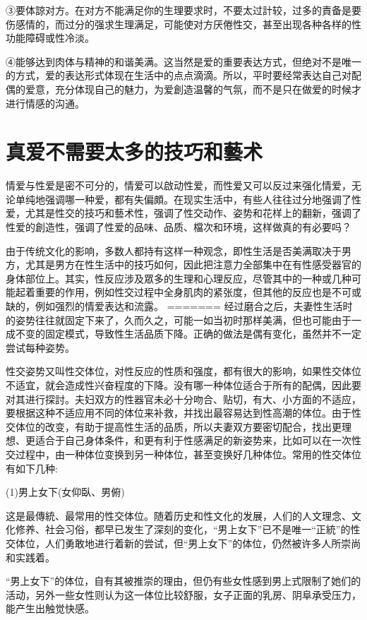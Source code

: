 \documentclass[12pt,UTF8]{ctexbook}
\begin{document}
③要体諒对方。在对方不能满足你的生理要求时，不要太过計较，过多的責备是要伤感情的，而过分的强求生理满足，可能使对方厌倦性交，甚至出现各种各样的性功能障碍或性冷淡。

④能够达到肉体与精神的和谐美满。这当然是爱的重要表达方式，但绝对不是唯一的方式，爱的表达形式体现在生活中的点点滴滴。所以，平时要经常表达自己对配偶的爱意，充分体现自己的魅力，为爱創造温馨的气氛，而不是只在做爱的时候才进行情感的沟通。

\section{真爱不需要太多的技巧和藝术}

情爱与性爱是密不可分的，情爱可以啟动性爱，而性爱又可以反过来强化情爱，无论单纯地强调哪一种爱，都有失偏頗。在现实生活中，有些人往往过分地强调了性爱，尤其是性交的技巧和藝术性，强调了性交动作、姿势和花样上的翻新，强调了性爱的創造性，强调了性爱的品味、品质、檔次和环境，这样做真的有必要吗？

由于传统文化的影响，多数人都持有这样一种观念，即性生活是否美满取决于男方，尤其是男方在性生活中的技巧如何，因此把注意力全部集中在有性感受器官的身体部位上。其实，性反应涉及眾多的生理和心理反应，尽管其中的一种或几种可能起着重要的作用，例如性交过程中全身肌肉的紧张度，但其他的反应也是不可或缺的，例如强烈的情爱表达和流露。
=======
经过磨合之后，夫妻性生活时的姿势往往就固定下来了，久而久之，可能一如当初时那样美满，但也可能由于一成不变的固定模式，导致性生活品质下降。正确的做法是偶有变化，虽然并不一定尝试每种姿势。

性交姿势又叫性交体位，对性反应的性质和强度，都有很大的影响，如果性交体位不适宜，就会造成性兴奋程度的下降。没有哪一种体位适合于所有的配偶，因此要对其进行探討。夫妇双方的性器官未必十分吻合、贴切，有大、小方面的不适应，要根据这种不适应用不同的体位来补救，并找出最容易达到性高潮的体位。由于性交体位的改变，有助于提高性生活的品质，所以夫妻双方要密切配合，找出更理想、更适合于自己身体条件，和更有利于性感满足的新姿势来，比如可以在一次性交过程中，由一种体位变换到另一种体位，甚至变换好几种体位。常用的性交体位有如下几种:

(1)男上女下(女仰臥、男俯)

这是最傳統、最常用的性交体位。随着历史和性文化的发展，人们的人文理念、文化修养、社会习俗，都早已发生了深刻的变化，“男上女下”已不是唯一“正統”的性交体位，人们勇敢地进行着新的尝试，但“男上女下”的体位，仍然被许多人所崇尚和实践着。

“男上女下”的体位，自有其被推崇的理由，但仍有些女性感到男上式限制了她们的活动，另外一些女性则认为这一体位比较舒服，女子正面的乳房、阴阜承受压力，能产生出触觉快感。
\end{document}
